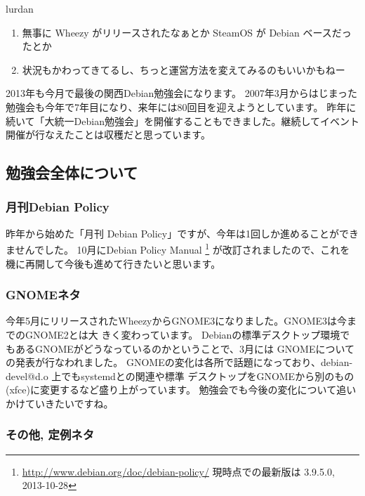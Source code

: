 \documentclass[mingoth,a4paper]{jsarticle}
\begin{document}
\begin{prework}{ lurdan }
  \begin{enumerate}
  \item 無事に Wheezy がリリースされたなぁとか SteamOS が Debian ベースだったとか
  \item 状況もかわってきてるし、ちっと運営方法を変えてみるのもいいかもねー
  \end{enumerate}
\end{prework}


2013年も今月で最後の関西Debian勉強会になります。
2007年3月からはじまった勉強会も今年で7年目になり、来年には80回目を迎えようとしています。
昨年に続いて「大統一Debian勉強会」を開催することもできました。継続してイベント開催が行なえたことは収穫だと思っています。

\subsection{勉強会全体について}

\subsubsection{月刊Debian Policy}

昨年から始めた「月刊 Debian Policy」ですが、今年は1回しか進めることができませんでした。
10月にDebian Policy Manual
\footnote{
  \url{http://www.debian.org/doc/debian-policy/}\newline
  現時点での最新版は 3.9.5.0, 2013-10-28
}
が改訂されましたので、これを機に再開して今後も進めて行きたいと思います。

\subsubsection{GNOMEネタ}

今年5月にリリースされたWheezyからGNOME3になりました。GNOME3は今までのGNOME2とは大
きく変わっています。
Debianの標準デスクトップ環境でもあるGNOMEがどうなっているのかということで、3月には
GNOMEについての発表が行なわれました。
GNOMEの変化は各所で話題になっており、debian-devel@d.o 上でもsystemdとの関連や標準
デスクトップをGNOMEから別のもの(xfce)に変更するなど盛り上がっています。
勉強会でも今後の変化について追いかけていきたいですね。

\subsubsection{その他, 定例ネタ}
\end{document}
